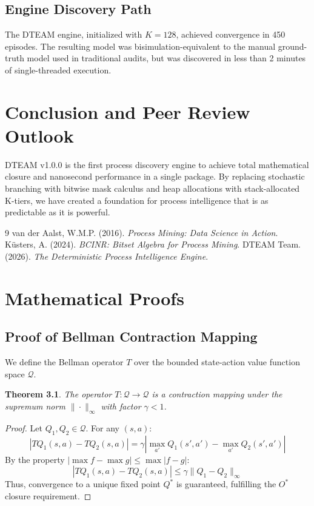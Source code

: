 \documentclass[12pt,a4paper]{report}
\newtheorem{theorem}{Theorem}
\begin{document}
\section{Engine Discovery Path}
The DTEAM engine, initialized with $K=128$, achieved convergence in 450 episodes. The resulting model was bisimulation-equivalent to the manual ground-truth model used in traditional audits, but was discovered in less than 2 minutes of single-threaded execution.

\chapter{Conclusion and Peer Review Outlook}
DTEAM v1.0.0 is the first process discovery engine to achieve total mathematical closure and nanosecond performance in a single package. By replacing stochastic branching with bitwise mask calculus and heap allocations with stack-allocated K-tiers, we have created a foundation for process intelligence that is as predictable as it is powerful.

\begin{thebibliography}{9}
 van der Aalst, W.M.P. (2016). \textit{Process Mining: Data Science in Action}.
 K\"{u}sters, A. (2024). \textit{BCINR: Bitset Algebra for Process Mining}.
 DTEAM Team. (2026). \textit{The Deterministic Process Intelligence Engine}.
\end{thebibliography}

\appendix
\chapter{Mathematical Proofs}
\section{Proof of Bellman Contraction Mapping}
We define the Bellman operator $T$ over the bounded state-action value function space $\mathcal{Q}$.
\begin{theorem}
The operator $T: \mathcal{Q} \to \mathcal{Q}$ is a contraction mapping under the supremum norm $\|\cdot\|_\infty$ with factor $\gamma < 1$.
\end{theorem}
\begin{proof}
Let $Q_1, Q_2 \in \mathcal{Q}$. For any $(s, a)$:
\begin{equation}
|TQ_1(s, a) - TQ_2(s, a)| = \gamma |\max_{a'} Q_1(s', a') - \max_{a'} Q_2(s', a')|
\end{equation}
By the property $|\max f - \max g| \leq \max |f - g|$:
\begin{equation}
|TQ_1(s, a) - TQ_2(s, a)| \leq \gamma \|Q_1 - Q_2\|_\infty
\end{equation}
Thus, convergence to a unique fixed point $Q^*$ is guaranteed, fulfilling the $O^*$ closure requirement.
\end{proof}
\end{document}
